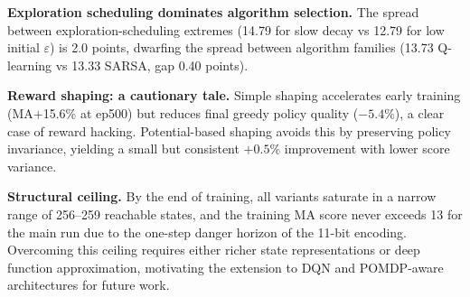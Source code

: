 \documentclass[10pt,conference]{IEEEtran}
\begin{document}
\textbf{Exploration scheduling dominates algorithm selection.}
The spread between exploration-scheduling extremes (14.79 for slow
decay vs 12.79 for low initial $\varepsilon$) is 2.0 points,
dwarfing the spread between algorithm families (13.73 Q-learning
vs 13.33 SARSA, gap 0.40 points).

\textbf{Reward shaping: a cautionary tale.}
Simple shaping accelerates early training (MA$+$15.6\% at ep500)
but reduces final greedy policy quality ($-5.4\%$), a clear case
of reward hacking.
Potential-based shaping avoids this by preserving policy invariance,
yielding a small but consistent $+0.5\%$ improvement with lower
score variance.

\textbf{Structural ceiling.}
By the end of training, all variants saturate in a narrow range of
256--259 reachable states, and the training MA score never exceeds 13
for the main run due to the one-step danger horizon of the 11-bit
encoding.
Overcoming this ceiling requires either richer state representations
or deep function approximation, motivating the extension to DQN
and POMDP-aware architectures for future work.
\end{document}
